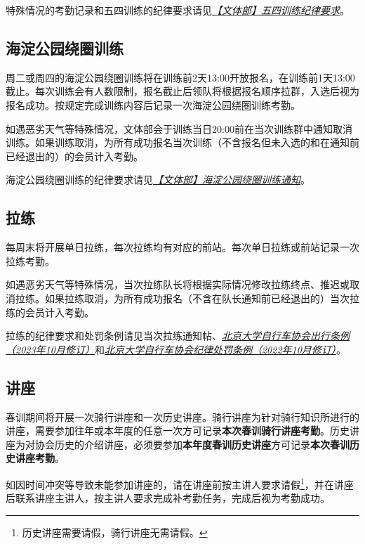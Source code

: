 \documentclass[UTF8]{ctexart}
\begin{document}
特殊情况的考勤记录和五四训练的纪律要求请见\href{https://chexie.net/bbs/content/index.php?bid=1\&tid=9576\&p=1}{\textit{【文体部】五四训练纪律要求}}。


\subsection{海淀公园绕圈训练}

周二或周四的海淀公园绕圈训练将在训练前2天13:00开放报名，在训练前1天13:00截止。每次训练会有人数限制，报名截止后领队将根据报名顺序拉群，入选后视为报名成功。按规定完成训练内容后记录一次海淀公园绕圈训练考勤。

如遇恶劣天气等特殊情况，文体部会于训练当日20:00前在当次训练群中通知取消训练。如果训练取消，为所有成功报名当次训练（不含报名但未入选的和在通知前已经退出的）的会员计入考勤。

海淀公园绕圈训练的纪律要求请见\href{https://chexie.net/bbs/content/?bid=1&tid=9615&p=1}{\textit{【文体部】海淀公园绕圈训练通知}}。

\subsection{拉练}

每周末将开展单日拉练，每次拉练均有对应的前站。每次单日拉练或前站记录一次拉练考勤。

如遇恶劣天气等特殊情况，当次拉练队长将根据实际情况修改拉练终点、推迟或取消拉练。如果拉练取消，为所有成功报名（不含在队长通知前已经退出的）当次拉练的会员计入考勤。

拉练的纪律要求和处罚条例请见当次拉练通知帖、\href{https://chexie.net/bbs/content/?bid=1&tid=9618&p=1}{\textit{北京大学自行车协会出行条例（2023年10月修订）}}和\href{https://chexie.net/bbs/content/?bid=1&tid=9260&p=1}{\textit{北京大学自行车协会纪律处罚条例（2022年10月修订）}}。

\subsection{讲座}


春训期间将开展一次骑行讲座和一次历史讲座。骑行讲座为针对骑行知识所进行的讲座，需要参加往年或本年度的任意一次方可记录\textbf{本次春训骑行讲座考勤}。历史讲座为对协会历史的介绍讲座，必须要参加\textbf{本年度春训历史讲座}方可记录\textbf{本次春训历史讲座考勤}。

如因时间冲突等导致未能参加讲座的，请在讲座前按主讲人要求请假\footnote{历史讲座需要请假，骑行讲座无需请假。}，并在讲座后联系讲座主讲人，按主讲人要求完成补考勤任务，完成后视为考勤成功。
\end{document}
